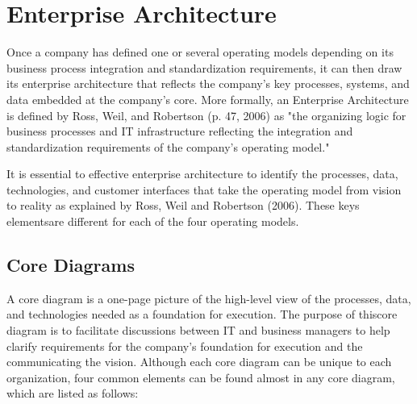\chapter{Enterprise Architecture}
\label{ch:enterprise-architecture}

Once a company has defined one or several operating models depending on its business process integration and
standardization requirements, it can then draw its enterprise architecture that reflects the company’s key processes,
systems, and data embedded at the company's core.
More formally, an Enterprise Architecture is defined by Ross, Weil, and Robertson (p. 47, 2006) as
"the organizing logic for business processes and IT infrastructure reflecting the integration and standardization
requirements of the company's operating model."

It is essential to effective enterprise architecture to identify the processes, data, technologies, and
customer interfaces that take the operating model from vision to reality as explained
by Ross, Weil and Robertson (2006).
These keys elementsare different for each of the four operating models.

\section*{Core Diagrams}

A core diagram is a one-page picture of the high-level view of the processes, data, and technologies needed as a
foundation for execution.
The purpose of thiscore diagram is to facilitate discussions between IT and business managers to help clarify
requirements for the company's foundation for execution and the communicating the vision.
Although each core diagram can be unique to each organization, four common elements can be found almost
in any core diagram, which are listed as follows:

